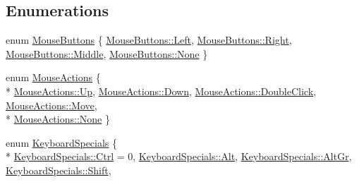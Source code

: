 \subsection*{Enumerations}
\begin{DoxyCompactItemize}
\item 
enum \hyperlink{namespace_osiris_i_1_1_events_aea8719a5bb7bb7a2296aa7469d9163e1}{Mouse\-Buttons} \{ \hyperlink{namespace_osiris_i_1_1_events_aea8719a5bb7bb7a2296aa7469d9163e1a945d5e233cf7d6240f6b783b36a374ff}{Mouse\-Buttons\-::\-Left}, 
\hyperlink{namespace_osiris_i_1_1_events_aea8719a5bb7bb7a2296aa7469d9163e1a92b09c7c48c520c3c55e497875da437c}{Mouse\-Buttons\-::\-Right}, 
\hyperlink{namespace_osiris_i_1_1_events_aea8719a5bb7bb7a2296aa7469d9163e1ab1ca34f82e83c52b010f86955f264e05}{Mouse\-Buttons\-::\-Middle}, 
\hyperlink{namespace_osiris_i_1_1_events_aea8719a5bb7bb7a2296aa7469d9163e1a6adf97f83acf6453d4a6a4b1070f3754}{Mouse\-Buttons\-::\-None}
 \}
\item 
enum \hyperlink{namespace_osiris_i_1_1_events_acfad4999b4155d29322b52fa50c40d08}{Mouse\-Actions} \{ \\*
\hyperlink{namespace_osiris_i_1_1_events_acfad4999b4155d29322b52fa50c40d08a258f49887ef8d14ac268c92b02503aaa}{Mouse\-Actions\-::\-Up}, 
\hyperlink{namespace_osiris_i_1_1_events_acfad4999b4155d29322b52fa50c40d08a08a38277b0309070706f6652eeae9a53}{Mouse\-Actions\-::\-Down}, 
\hyperlink{namespace_osiris_i_1_1_events_acfad4999b4155d29322b52fa50c40d08a99f490e53ed16a6580a350b42e1143a9}{Mouse\-Actions\-::\-Double\-Click}, 
\hyperlink{namespace_osiris_i_1_1_events_acfad4999b4155d29322b52fa50c40d08a6bc362dbf494c61ea117fe3c71ca48a5}{Mouse\-Actions\-::\-Move}, 
\\*
\hyperlink{namespace_osiris_i_1_1_events_acfad4999b4155d29322b52fa50c40d08a6adf97f83acf6453d4a6a4b1070f3754}{Mouse\-Actions\-::\-None}
 \}
\item 
enum \hyperlink{namespace_osiris_i_1_1_events_a9e0e697b7b35b97c94c7b6d758a117be}{Keyboard\-Specials} \{ \\*
\hyperlink{namespace_osiris_i_1_1_events_a9e0e697b7b35b97c94c7b6d758a117bea2b61e0d5977f2e38f06e16281c802b47}{Keyboard\-Specials\-::\-Ctrl} = 0, 
\hyperlink{namespace_osiris_i_1_1_events_a9e0e697b7b35b97c94c7b6d758a117beaa2e92861b757ab878312dd57993d60cf}{Keyboard\-Specials\-::\-Alt}, 
\hyperlink{namespace_osiris_i_1_1_events_a9e0e697b7b35b97c94c7b6d758a117bea571dc3ee993d6e9a33bdc851be52b995}{Keyboard\-Specials\-::\-Alt\-Gr}, 
\hyperlink{namespace_osiris_i_1_1_events_a9e0e697b7b35b97c94c7b6d758a117bea825a3d98017bab11815ad2817201324c}{Keyboard\-Specials\-::\-Shift}, 

\end{DoxyCompactItemize}
